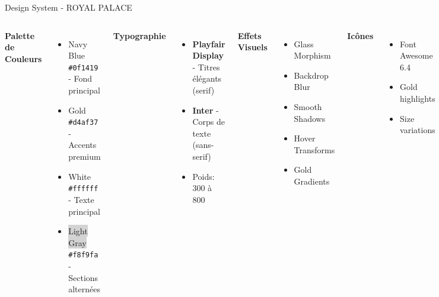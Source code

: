 \documentclass[aspectratio=169]{beamer}
\begin{document}
\begin{frame}{Design System - ROYAL PALACE}
    \begin{columns}
        \textbf{Palette de Couleurs}
        \begin{itemize}
            \item \colorbox{navyblue}{\color{white}Navy Blue} \texttt{\#0f1419} - Fond principal
            \item \colorbox{goldcolor}{\color{navyblue}Gold} \texttt{\#d4af37} - Accents premium
            \item \colorbox{white}{White} \texttt{\#ffffff} - Texte principal
            \item \colorbox{lightgray}{Light Gray} \texttt{\#f8f9fa} - Sections alternées
        \end{itemize}
        
        \vspace{10pt}
        \textbf{Typographie}
        \begin{itemize}
            \item \textbf{Playfair Display} - Titres élégants (serif)
            \item \textbf{Inter} - Corps de texte (sans-serif)
            \item Poids: 300 à 800
        \end{itemize}
        
        \textbf{Effets Visuels}
        \begin{itemize}
            \item Glass Morphism
            \item Backdrop Blur
            \item Smooth Shadows
            \item Hover Transforms
            \item Gold Gradients
        \end{itemize}
        
        \vspace{10pt}
        \textbf{Icônes}
        \begin{itemize}
            \item Font Awesome 6.4
            \item Gold highlights
            \item Size variations
        \end{itemize}
    \end{columns}
\end{frame}
\end{document}
